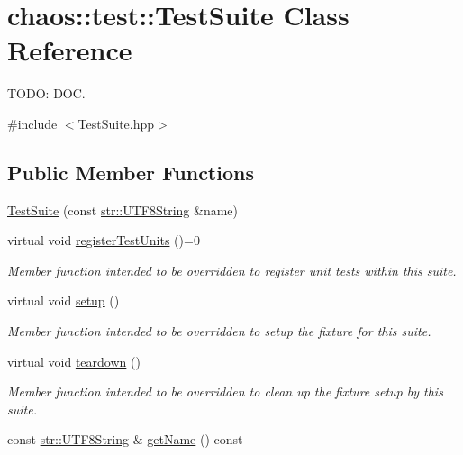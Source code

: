 \hypertarget{classchaos_1_1test_1_1_test_suite}{\section{chaos\-:\-:test\-:\-:Test\-Suite Class Reference}
\label{classchaos_1_1test_1_1_test_suite}
}


T\-O\-D\-O\-: D\-O\-C.  




{\ttfamily \#include $<$Test\-Suite.\-hpp$>$}

\subsection*{Public Member Functions}
\begin{DoxyCompactItemize}
\item 
\hyperlink{classchaos_1_1test_1_1_test_suite_ac5a8385941fb08aa26c0735d45252747}{Test\-Suite} (const \hyperlink{classchaos_1_1str_1_1_u_t_f8_string}{str\-::\-U\-T\-F8\-String} \&name)
\item 
virtual void \hyperlink{classchaos_1_1test_1_1_test_suite_a3d9c8c7f0ff3f7b1f74717abc747b3fd}{register\-Test\-Units} ()=0
\begin{DoxyCompactList}\small\item\em Member function intended to be overridden to register unit tests within this suite. \end{DoxyCompactList}\item 
virtual void \hyperlink{classchaos_1_1test_1_1_test_suite_ad0a1e7224769042c7ef55c1cd6192982}{setup} ()
\begin{DoxyCompactList}\small\item\em Member function intended to be overridden to setup the fixture for this suite. \end{DoxyCompactList}\item 
virtual void \hyperlink{classchaos_1_1test_1_1_test_suite_a6ff5bccbbc0f6590f9c921734ed40029}{teardown} ()
\begin{DoxyCompactList}\small\item\em Member function intended to be overridden to clean up the fixture setup by this suite. \end{DoxyCompactList}\item 
const \hyperlink{classchaos_1_1str_1_1_u_t_f8_string}{str\-::\-U\-T\-F8\-String} \& \hyperlink{classchaos_1_1test_1_1_test_suite_a4710c28a3ba388d613320a8e1e71014a}{get\-Name} () const 
\end{DoxyCompactItemize}
